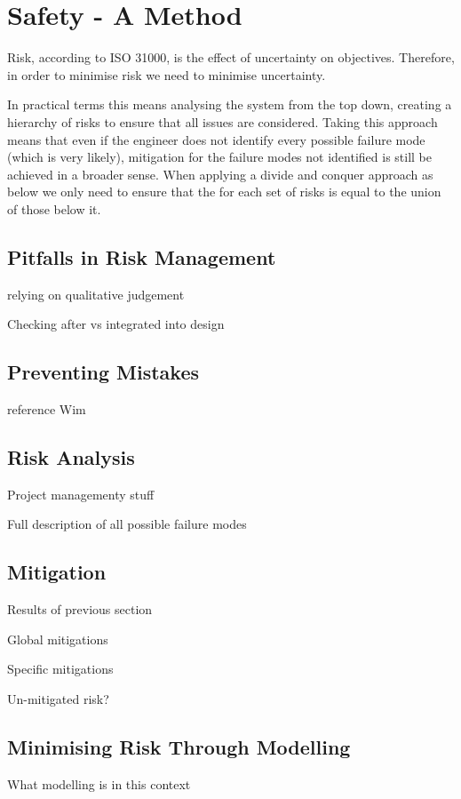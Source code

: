 \section{Safety - A Method}
Risk, according to ISO 31000\cite{ISO31000}, is the effect of uncertainty on objectives. 
Therefore, in order to minimise risk we need to minimise uncertainty.

In practical terms this means analysing the system from the top down,
creating a hierarchy of risks to ensure that all issues are considered. 
Taking this approach means that even if the engineer does not identify
every possible failure mode (which is very likely), mitigation for the
failure modes not identified is still be achieved in a broader sense. 
When applying a divide and conquer approach as below we only need
to ensure that the for each set of risks is equal to the union of those below it.

\subsection{Pitfalls in Risk Management}
relying on qualitative judgement

Checking after vs integrated into design

\subsection{Preventing Mistakes}
reference Wim

\subsection{Risk Analysis}


Project managementy stuff

 Full description of all possible failure modes

\subsection{Mitigation}
Results of previous section

Global mitigations

Specific mitigations

Un-mitigated risk?

\subsection{Minimising Risk Through Modelling}
What modelling is in this context

